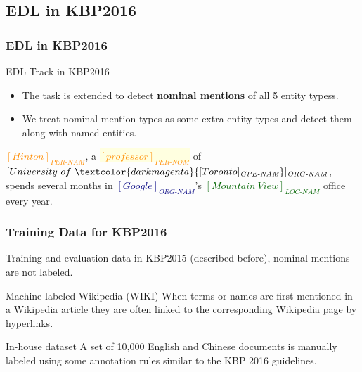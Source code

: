 \documentclass{beamer}
\begin{document}
\subsection{EDL in KBP2016}

\begin{frame}
\frametitle{EDL in KBP2016}
\begin{block}{EDL Track in KBP2016 \parencite{kbpoverview2016}}
\begin{itemize}
	\item The task is extended to detect \textbf{nominal mentions} of all 5 entity typess. 
	\item We treat nominal mention types as some extra entity types and detect them along with named entities.  
\end{itemize}
\end{block}
\begin{example}
	\textcolor{darkorange}{$[Hinton]_{\textit{PER-NAM}}$}, 
	a \colorbox{lightyellow}{\textcolor{darkorange}{$[professor]_{\textit{PER-NOM}}$}} of \textcolor{navy}{$[University\ of\ \textcolor{darkmagenta}{[Toronto]_{\textit{GPE-NAM}}}]_{\textit{ORG-NAM}}$}, 
	spends several months in \textcolor{navy}{$[Google]_{\textit{ORG-NAM}}$}'s 
	\textcolor{darkgreen}{$[Mountain\ View]_{\textit{LOC-NAM}}$} office every year.
\end{example}
\end{frame}

\begin{frame}
\frametitle{Training Data for KBP2016}
\begin{block}{Training and evaluation data in KBP2015}
	(described before), nominal mentions are not labeled.
\end{block}
\begin{block}{Machine-labeled Wikipedia (WIKI)}
	When terms or names are first mentioned in a Wikipedia article they are often linked to the corresponding Wikipedia page by hyperlinks. 
\end{block} 
\begin{block}{In-house dataset}
	A set of 10,000 English and Chinese documents is manually labeled using some annotation rules similar to the KBP 2016 guidelines.
\end{block}
\end{frame}
\end{document}
